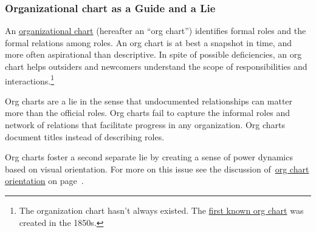 \subsubsection*{Organizational chart as a Guide and a Lie\label{sec:org-chart-as-guide-and-lie}}

An \href{https://en.wikipedia.org/wiki/Organizational_chart}{organizational chart} 
(hereafter an ``\gls{org chart}'') identifies formal roles and the formal relations among roles. An org chart is at best a snapshot in time, and more often aspirational than descriptive. In spite of possible deficiencies, an org chart helps outsiders and newcomers understand the scope of responsibilities and interactions.\footnote{The organization chart hasn't always existed. The \href{https://en.wikipedia.org/wiki/George_Holt_Henshaw\#First_organization_chart}{first known org chart} 
was created in the 1850s.}

Org charts are a lie in the sense that undocumented relationships can matter more than the official roles. Org charts fail to capture the informal roles and network of relations that facilitate progress in any organization. Org charts document titles instead of describing roles.

Org charts foster a second separate lie by creating a sense of power dynamics based on visual orientation. For more on this issue see the discussion of~\hyperref[sec:org-chart-orientation]{org chart orientation} on page~\pageref{sec:org-chart-orientation}.
